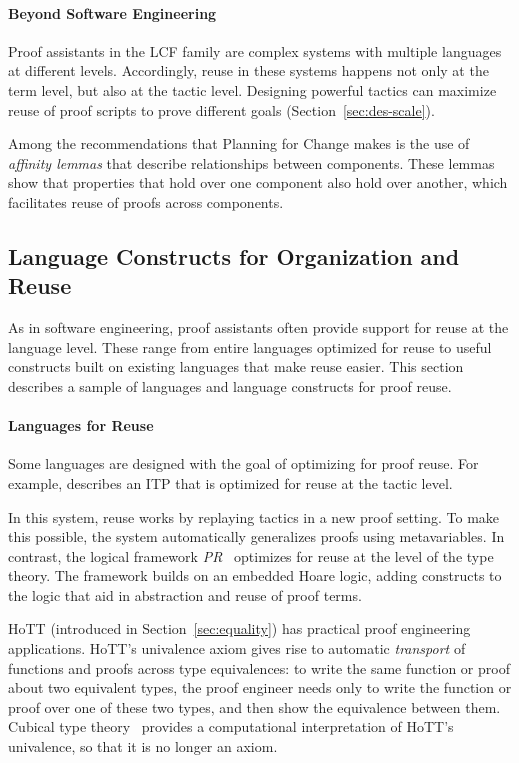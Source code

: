 
\paragraph{Beyond Software Engineering}
Proof assistants in the LCF family are complex systems with multiple languages at different levels.
Accordingly, reuse in these systems happens not only at the term level, but also at the tactic level.
Designing powerful tactics can maximize reuse of proof scripts to prove different goals (Section~\ref{sec:des-scale}).

Among the recommendations that Planning for Change makes
is the use of \textit{affinity lemmas} that describe relationships between components.
These lemmas show that properties that hold over one component also hold over another,
which facilitates reuse of proofs across components.


\subsection{Language Constructs for Organization and Reuse}
\label{sec:languagereuse}

As in software engineering, proof assistants often provide support for reuse at the language level.
These range from entire languages optimized for reuse to useful constructs built
on existing languages that make reuse easier.
This section describes a sample of languages and language constructs for proof reuse.

\paragraph{Languages for Reuse}
Some languages are designed with the goal of optimizing for proof reuse.
For example, \cite{Felty1994} describes an ITP that is optimized for reuse at the tactic level.

In this system, reuse works by replaying tactics in a new proof setting.
To make this possible, the system automatically generalizes proofs using metavariables.
In contrast, the logical framework \textit{PR}~\citep{Caplan1995} optimizes for reuse at the level of the type theory.
The framework builds on an embedded Hoare logic, adding constructs to the logic
that aid in abstraction and reuse of proof terms.

HoTT (introduced in Section~\ref{sec:equality}) has practical proof engineering applications.
HoTT's univalence axiom gives rise to automatic \textit{transport} of functions and proofs
across type equivalences: to write the same function or proof about two equivalent types, the proof engineer needs only to
write the function or proof over one of these two types,
and then show the equivalence between them.
Cubical type theory~\citep{cohen2016cubical} provides
a computational interpretation of HoTT's univalence, so that it is no longer an axiom.

